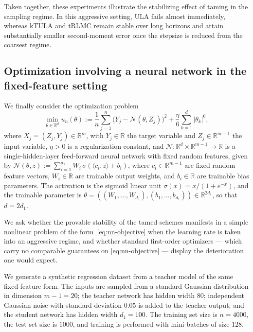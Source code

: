\documentclass[11pt,a4paper,reqno]{amsart}
\theoremstyle{plain}
\theoremstyle{definition}
\theoremstyle{remark}
\newcommand{\R}{\mathbb{R}}
\begin{document}
Taken together, these experiments illustrate the stabilizing effect of taming in the sampling regime. In this aggressive setting, ULA fails almost immediately, whereas kTULA and tRLMC remain stable over long horizons and attain substantially smaller second-moment error once the stepsize is reduced from the coarsest regime.




\subsection{Optimization involving a neural network in the fixed-feature setting}
\label{subsec:nn-experiment}

We finally consider the optimization problem
\begin{equation}
\min_{\theta\in\R^d} u_n(\theta)
:=
\frac{1}{n}\sum_{j=1}^n \bigl(Y_j-\mathcal{N}(\theta,Z_j)\bigr)^2
+\frac{\eta}{6}\sum_{k=1}^d |\theta_k|^6,
\label{eq:nn-objective}
\end{equation}
where \(X_j=(Z_j,Y_j)\in\R^m\), with \(Y_j\in\R\) the target variable and \(Z_j\in\R^{m-1}\) the input variable, \(\eta>0\) is a regularization constant, and \(\mathcal{N}:\R^d\times\R^{m-1}\to\R\) is a single-hidden-layer feed-forward neural network with fixed random features, given by
\(\mathcal{N}(\theta,z):=\sum_{i=1}^{d_1} W_i\,\sigma(\langle c_i,z\rangle+b_i)\),
where \(c_i\in\R^{m-1}\) are fixed random feature vectors, \(W_i\in\R\) are trainable output weights, and \(b_i\in\R\) are trainable bias parameters. The activation is the sigmoid linear unit \(\sigma(x)=x/(1+e^{-x})\), and the trainable parameter is \(\theta=((W_1,\dots,W_{d_1}),(b_1,\dots,b_{d_1}))\in\R^{2d_1}\), so that \(d=2d_1\).

We ask whether the
provable stability of the tamed schemes manifests in a simple nonlinear
problem of the form~\eqref{eq:nn-objective} when the learning rate is taken
into an aggressive regime, and whether standard first-order optimizers — which
carry no comparable guarantees on \eqref{eq:nn-objective} — display the
deterioration one would expect.

We generate a synthetic regression dataset from a teacher model of the same fixed-feature form. The inputs are sampled from a standard Gaussian distribution in dimension \(m-1=20\); the teacher network has hidden width \(80\); independent Gaussian noise with standard deviation \(0.05\) is added to the teacher output; and the student network has hidden width \(d_1=100\). The training set size is \(n=4000\), the test set size is \(1000\), and training is performed with mini-batches of size \(128\).
\end{document}
